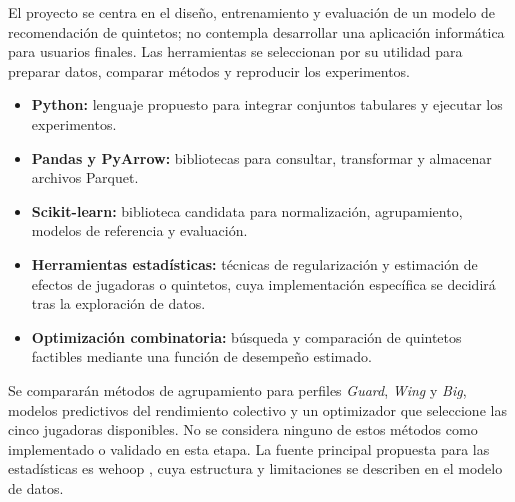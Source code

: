 El proyecto se centra en el diseño, entrenamiento y evaluación de un modelo de recomendación de quintetos; no contempla desarrollar una aplicación informática para usuarios finales. Las herramientas se seleccionan por su utilidad para preparar datos, comparar métodos y reproducir los experimentos.

\begin{itemize}
 \item \textbf{Python:} lenguaje propuesto para integrar conjuntos tabulares y ejecutar los experimentos.
 \item \textbf{Pandas y PyArrow:} bibliotecas para consultar, transformar y almacenar archivos Parquet.
 \item \textbf{Scikit-learn:} biblioteca candidata para normalización, agrupamiento, modelos de referencia y evaluación.
 \item \textbf{Herramientas estadísticas:} técnicas de regularización y estimación de efectos de jugadoras o quintetos, cuya implementación específica se decidirá tras la exploración de datos.
 \item \textbf{Optimización combinatoria:} búsqueda y comparación de quintetos factibles mediante una función de desempeño estimado.
\end{itemize}

Se compararán métodos de agrupamiento para perfiles \textit{Guard}, \textit{Wing} y \textit{Big}, modelos predictivos del rendimiento colectivo y un optimizador que seleccione las cinco jugadoras disponibles. No se considera ninguno de estos métodos como implementado o validado en esta etapa. La fuente principal propuesta para las estadísticas es wehoop \cite{wehoopRepositorio}, cuya estructura y limitaciones se describen en el modelo de datos.